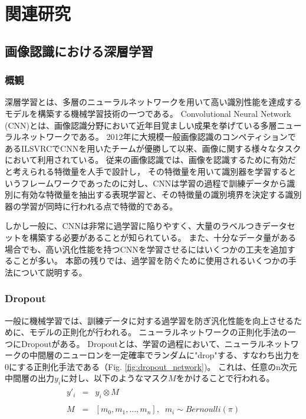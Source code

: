 \chapter{関連研究}

\section{画像認識における深層学習}
\subsection{概観}
深層学習とは、多層のニューラルネットワークを用いて高い識別性能を達成するモデルを構築する機械学習技術の一つである。
Convolutional Neural Network (CNN)とは、画像認識分野において近年目覚ましい成果を挙げている多層ニューラルネットワークである。
2012年に大規模一般画像認識のコンペティションであるILSVRC\cite{ILSVRC15}でCNNを用いたチームが優勝して以来、画像に関する様々なタスクにおいて利用されている。
従来の画像認識では、画像を認識するために有効だと考えられる特徴量を人手で設計し，
その特徴量を用いて識別器を学習するというフレームワークであったのに対し、CNNは学習の過程で訓練データから識別に有効な特徴量を抽出する表現学習と、その特徴量の識別境界を決定する識別器の学習が同時に行われる点で特徴的である。

しかし一般に、CNNは非常に過学習に陥りやすく、大量のラベルつきデータセットを構築する必要があることが知られている。
また、十分なデータ量がある場合でも、高い汎化性能を持つCNNを学習させるにはいくつかの工夫を追加することが多い。
本節の残りでは、過学習を防ぐために使用されるいくつかの手法について説明する。

\subsection{Dropout}
一般に機械学習では、訓練データに対する過学習を防ぎ汎化性能を向上させるために、モデルの正則化が行われる。
ニューラルネットワークの正則化手法の一つにDropout\cite{hinton2012improving, srivastava2014dropout}がある。
Dropoutとは、学習の過程において、ニューラルネットワークの中間層のニューロンを一定確率でランダムに"drop"する、すなわち出力を0にする正則化手法である（Fig. \ref{fig:dropout_network})。
これは、任意のn次元中間層の出力$y_i$に対し、以下のようなマスク$M$をかけることで行われる。
\begin{eqnarray}
    \begin{split}
        y'_i &=& y_i \otimes M \\
        \\
        M &=& [m_0, m_1, \dots, m_n],\;\; m_i \sim Bernoulli(\pi) 
    \end{split}
\end{eqnarray}

